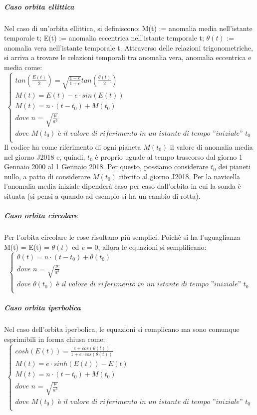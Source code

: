 \documentclass[a4paper]{article}
\begin{document}
\subparagraph{Caso orbita ellittica\newline}
Nel caso di un'orbita ellittica, si definiscono:	\newline
M(t) := anomalia media nell'istante temporale t; \newline
E(t) := anomalia eccentrica nell'istante temporale t;\newline
$\theta(t)$ := anomalia vera nell'istante temporale t.\newline
Attraverso delle relazioni trigonometriche, si arriva a trovare le relazioni temporali tra anomalia vera, anomalia eccentrica e media come:
\[
\begin{cases}
tan(\frac{E(t)}{2}) = \sqrt{\frac{1-e}{1+e}}tan(\frac{\theta(t)}{2}) \\
M(t) = E(t) - e \cdot sin(E(t)) \\
M(t) = n\cdot(t-t_{0}) + M(t_{0}) \\
\textit{dove n = $\sqrt{\frac{\mu}{a^{3}}}$} \\
\textit{dove $M(t_{0})$ è il valore di riferimento in un istante di tempo ''iniziale'' $t_{0}$} \\
\end{cases}
\]\newline
Il codice ha come riferimento di ogni pianeta $M(t_{0})$ il valore di anomalia media nel giorno J2018 e, quindi, $t_{0}$ è proprio uguale al tempo trascorso dal giorno 1 Gennaio 2000 al 1 Gennaio 2018. Per questo, possiamo considerare $t_{0}$ dei pianeti nullo, a patto di considerare  $M(t_{0})$ riferito al giorno J2018. Per la navicella l'anomalia media iniziale dipenderà caso per caso dall'orbita in cui la sonda è situata (si pensi a quando ad esempio si ha un cambio di rotta).
\subparagraph{Caso orbita circolare\newline}
Per l'orbita circolare le cose risultano più semplici. Poichè si ha l'uguaglianza M(t) = E(t) = $\theta(t)$ ed \textit{e} = 0, allora le equazioni si semplificano:\newline
\[
\begin{cases}
\theta(t) = n\cdot(t-t_{0}) + \theta(t_{0}) \\
\textit{dove n = $\sqrt{\frac{\mu}{a^{3}}}$} \\
\textit{dove $\theta(t_{0})$ è il valore di riferimento in un istante di tempo ''iniziale'' $t_{0}$} \\
\end{cases}
\]
\subparagraph{Caso orbita iperbolica\newline}
Nel caso dell'orbita iperbolica, le equazioni si complicano ma sono comunque esprimibili in forma chiusa come:
\[
\begin{cases}
cosh(E(t)) = \frac{e+cos(\theta(t))}{1+e\cdot cos(\theta(t))} \\
M(t) = e \cdot sinh(E(t)) - E(t) \\
M(t) = n\cdot(t-t_{0}) + M(t_{0}) \\
\textit{dove n = $\sqrt{\frac{\mu}{a^{3}}}$} \\
\textit{dove $M(t_{0})$ è il valore di riferimento in un istante di tempo ''iniziale'' $t_{0}$} \\
\end{cases}
\]
\newpage
\end{document}
